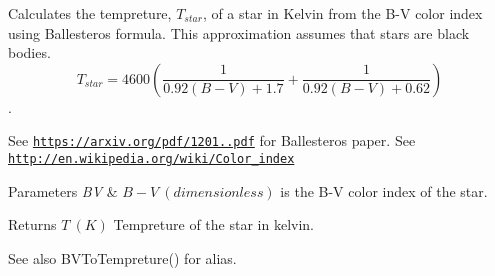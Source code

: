 Calculates the tempreture, $T_{star}$, of a star in Kelvin from the B-\/V color index using Ballesteros\textquotesingle{} formula. This approximation assumes that stars are black bodies. \[T_{star}=4600 \left ( \frac{1}{0.92 (B-V)+ 1.7} + \frac{1}{0.92 (B-V) + 0.62} \right )\]. 

See \href{https://arxiv.org/pdf/1201.1809.pdf}{\tt https\+://arxiv.\+org/pdf/1201..\+pdf} for Ballesteros\textquotesingle{} paper. See \href{http://en.wikipedia.org/wiki/Color_index}{\tt http\+://en.\+wikipedia.\+org/wiki/\+Color\+\_\+index}


\begin{DoxyParams}{Parameters}
{\em BV} & $B-V\ (dimensionless)$ is the B-\/V color index of the star. \\
\hline
\end{DoxyParams}
\begin{DoxyReturn}{Returns}
$T\ (K)$ Tempreture of the star in kelvin. 
\end{DoxyReturn}
\begin{DoxySeeAlso}{See also}
B\+V\+To\+Tempreture() for alias. 
\end{DoxySeeAlso}
